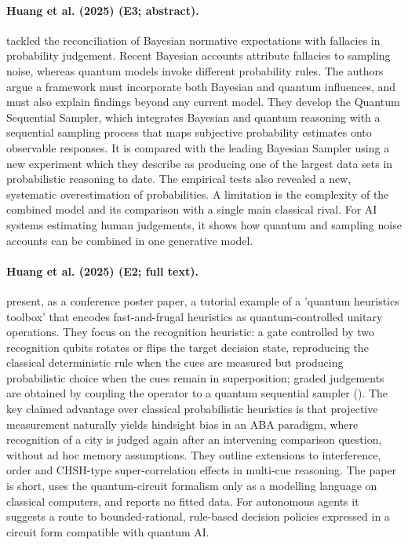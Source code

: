 \documentclass[10pt,a4paper]{article}
\begin{document}
\paragraph{Huang et al. (2025) (E3; abstract).} \citet{Huang2025a} tackled the reconciliation of Bayesian normative expectations with fallacies in probability judgement. Recent Bayesian accounts attribute fallacies to sampling noise, whereas quantum models invoke different probability rules. The authors argue a framework must incorporate both Bayesian and quantum influences, and must also explain findings beyond any current model. They develop the Quantum Sequential Sampler, which integrates Bayesian and quantum reasoning with a sequential sampling process that maps subjective probability estimates onto observable responses. It is compared with the leading Bayesian Sampler using a new experiment which they describe as producing one of the largest data sets in probabilistic reasoning to date. The empirical tests also revealed a new, systematic overestimation of probabilities. A limitation is the complexity of the combined model and its comparison with a single main classical rival. For AI systems estimating human judgements, it shows how quantum and sampling noise accounts can be combined in one generative model.

\paragraph{Huang et al. (2025) (E2; full text).} \citet{Huang2025c} present, as a conference poster paper, a tutorial example of a 'quantum heuristics toolbox' that encodes fast-and-frugal heuristics as quantum-controlled unitary operations. They focus on the recognition heuristic: a gate controlled by two recognition qubits rotates or flips the target decision state, reproducing the classical deterministic rule when the cues are measured but producing probabilistic choice when the cues remain in superposition; graded judgements are obtained by coupling the operator to a quantum sequential sampler (\citep{Huang2025a}). The key claimed advantage over classical probabilistic heuristics is that projective measurement naturally yields hindsight bias in an ABA paradigm, where recognition of a city is judged again after an intervening comparison question, without ad hoc memory assumptions. They outline extensions to interference, order and CHSH-type super-correlation effects in multi-cue reasoning. The paper is short, uses the quantum-circuit formalism only as a modelling language on classical computers, and reports no fitted data. For autonomous agents it suggests a route to bounded-rational, rule-based decision policies expressed in a circuit form compatible with quantum AI.
\end{document}

